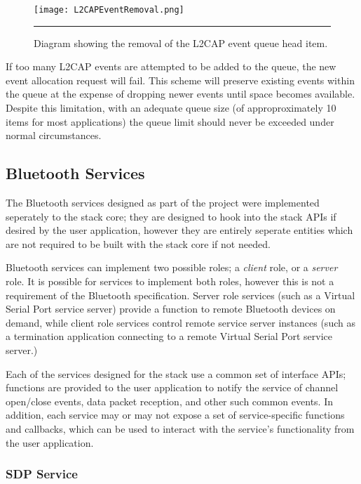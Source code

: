 \begin{figure}[tbph]
	\vspace{1em}
	\centering
		\texttt{[image: L2CAPEventRemoval.png]}
	\rule{35em}{0.5pt}
	\caption[L2CAP Event Object Queue Removal]{Diagram showing the removal of the L2CAP event queue head item.}
	\label{fig:l2capeventremoval}
\end{figure}

If too many L2CAP events are attempted to be added to the queue, the new event allocation request will fail. This scheme will preserve existing events within the queue at the expense of dropping newer events until space becomes available. Despite this limitation, with an adequate queue size (of approproximately 10 items for most applications) the queue limit should never be exceeded under normal circumstances.

\FloatBarrier
\subsection{Bluetooth Services}

The Bluetooth services designed as part of the project were implemented seperately to the stack core; they are designed to hook into the stack APIs if desired by the user application, however they are entirely seperate entities which are not required to be built with the stack core if not needed.

Bluetooth services can implement two possible roles; a \textit{client} role, or a \textit{server} role. It is possible for services to implement both roles, however this is not a requirement of the Bluetooth specification. Server role services (such as a Virtual Serial Port service server) provide a function to remote Bluetooth devices on demand, while client role services control remote service server instances (such as a termination application connecting to a remote Virtual Serial Port service server.)

Each of the services designed for the stack use a common set of interface APIs; functions are provided to the user application to notify the service of channel open/close events, data packet reception, and other such common events. In addition, each service may or may not expose a set of service-specific functions and callbacks, which can be used to interact with the service's functionality from the user application.

\FloatBarrier
\subsubsection{SDP Service}

